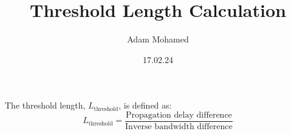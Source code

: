 \documentclass{article}
\begin{document}
\title{Threshold Length Calculation}
\author{Adam Mohamed}
\date{17.02.24}

\maketitle

The threshold length, \( L_{\text{threshold}} \), is defined as:
\begin{equation}
L_{\text{threshold}} = \frac{\text{Propagation delay difference}}{\text{Inverse bandwidth difference}}
\end{equation}
\end{document}
